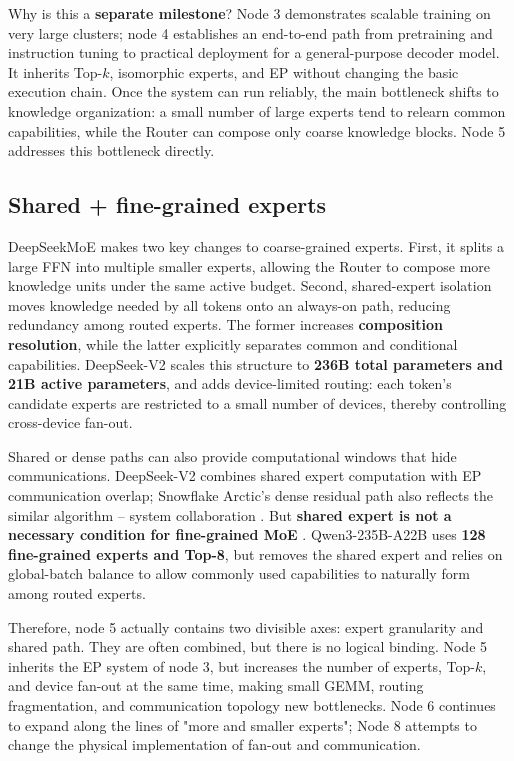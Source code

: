 \documentclass[10pt,a4paper,fontset=none]{ctexart}
\newcommand{\term}[1]{\textbf{#1}}
\begin{document}
Why is this a \textbf{separate milestone}? Node 3 demonstrates scalable training on very large clusters; node 4 establishes an end-to-end path from pretraining and instruction tuning to practical deployment for a general-purpose decoder model. It inherits Top-$k$, isomorphic experts, and EP without changing the basic execution chain. Once the system can run reliably, the main bottleneck shifts to knowledge organization: a small number of large experts tend to relearn common capabilities, while the Router can compose only coarse knowledge blocks. Node 5 addresses this bottleneck directly.

\subsection{Shared + fine-grained experts}

DeepSeekMoE makes two key changes to coarse-grained experts\cite{en:dai2024deepseekmoe}. First, it splits a large FFN into multiple smaller experts, allowing the Router to compose more knowledge units under the same active budget. Second, shared-expert isolation moves knowledge needed by all tokens onto an always-on path, reducing redundancy among routed experts. The former increases \term{composition resolution}, while the latter explicitly separates common and conditional capabilities. DeepSeek-V2 scales this structure to \textbf{236B total parameters and 21B active parameters}, and adds device-limited routing: each token's candidate experts are restricted to a small number of devices, thereby controlling cross-device fan-out\cite{en:deepseekv2}.

Shared or dense paths can also provide computational windows that hide communications. DeepSeek-V2 combines shared expert computation with EP communication overlap; Snowflake Arctic's dense residual path also reflects the similar algorithm -- system collaboration \cite{en:snowflakearctic}. But \term{shared expert is not a necessary condition for fine-grained MoE }. Qwen3-235B-A22B uses \textbf{128 fine-grained experts and Top-8}, but removes the shared expert and relies on global-batch balance to allow commonly used capabilities to naturally form \cite{en:qwen3} among routed experts.

Therefore, node 5 actually contains two divisible axes: expert granularity and shared path. They are often combined, but there is no logical binding. Node 5 inherits the EP system of node 3, but increases the number of experts, Top-$k$, and device fan-out at the same time, making small GEMM, routing fragmentation, and communication topology new bottlenecks. Node 6 continues to expand along the lines of "more and smaller experts"; Node 8 attempts to change the physical implementation of fan-out and communication.
\end{document}
